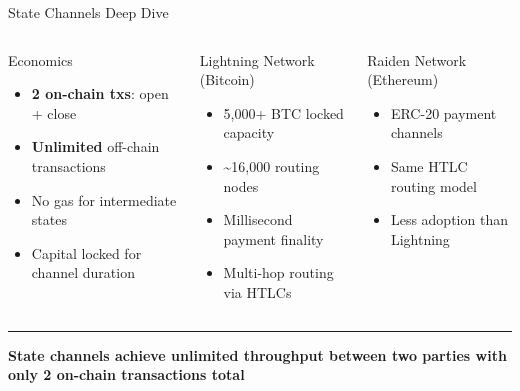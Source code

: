 \documentclass[8pt,aspectratio=169]{beamer}
\newcommand{\bottomnote}[1]{\vfill\vspace{-2mm}\textcolor{mllavender2}{\rule{\textwidth}{0.4pt}}\vspace{1mm}\footnotesize\textbf{#1}}
\begin{document}
\begin{frame}{State Channels Deep Dive}
\begin{columns}[T]
\vspace{4mm}
\begin{block}{Economics}
\footnotesize
\begin{itemize}
  \item \textbf{2 on-chain txs}: open + close
  \item \textbf{Unlimited} off-chain transactions
  \item No gas for intermediate states
  \item Capital locked for channel duration
\end{itemize}
\end{block}
\vspace{2mm}
\begin{block}{Lightning Network (Bitcoin)}
\footnotesize
\begin{itemize}
  \item 5,000+ BTC locked capacity
  \item \textasciitilde16,000 routing nodes
  \item Millisecond payment finality
  \item Multi-hop routing via HTLCs
\end{itemize}
\end{block}
\vspace{2mm}
\begin{block}{Raiden Network (Ethereum)}
\footnotesize
\begin{itemize}
  \item ERC-20 payment channels
  \item Same HTLC routing model
  \item Less adoption than Lightning
\end{itemize}
\end{block}
\end{columns}
\bottomnote{State channels achieve unlimited throughput between two parties with only 2 on-chain transactions total}
\end{frame}
\end{document}

